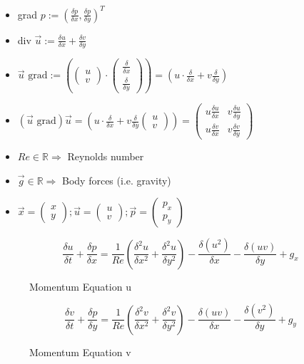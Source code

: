 \documentclass[a4paper,11pt]{scrartcl}
\begin{document}
\begin{itemize}
	\item grad $p := (\frac{\delta p}{\delta x},\frac{\delta p}{\delta y})^T$
	\item div $\vec{u} := \frac{\delta u}{\delta x} + \frac{\delta v}{\delta y}$
	\item $\vec{u} \text{ grad} := \left( \begin{pmatrix}
		u \\
		v
	\end{pmatrix}
	\cdot \begin{pmatrix}
		\frac{\delta}{\delta x} \\
		\frac{\delta}{\delta y}
	\end{pmatrix}\right)
	= (u \cdot \frac{\delta}{\delta x} + v \frac{\delta}{\delta y})$
	\item $(\vec{u} \text{ grad} ) \vec{u} = \left( u \cdot \frac{\delta}{\delta x} + v \frac{\delta}{\delta y}\begin{pmatrix}
		u \\
		v
	\end{pmatrix}\right) = \begin{pmatrix}
		u \frac{\delta u}{\delta x} & v \frac{\delta u}{\delta y}\\
		u \frac{\delta v}{\delta x} & v \frac{\delta v}{\delta y}
	\end{pmatrix}$
	\item $Re \in \mathds{R} \Rightarrow$ Reynolds number
	\item $\vec{g} \in \mathds{R} \Rightarrow$ Body forces (i.e. gravity)
	\item $\vec{x} = \begin{pmatrix}
	x\\
	y
	\end{pmatrix}; \vec{u} = \begin{pmatrix}
	u\\
	v
	\end{pmatrix}; \vec{p} = \begin{pmatrix}
	p_x \\
	p_y
	\end{pmatrix}$
\end{itemize}

\begin{figure}
	\centering
	\[ \frac{\delta u}{\delta t} + \frac{\delta p}{\delta x} = \frac{1}{Re} \left( \frac{\delta^2 u}{\delta x^2} + \frac{\delta^2 u}{\delta y^2}\right) - \frac{\delta (u^2)}{\delta x} - \frac{\delta (uv)}{\delta y} + g_x\]
    \renewcommand{\thefigure}{2.2a}
	\caption{Momentum Equation u}
	\label{fig:momentuma}
\end{figure}
\begin{figure}
	\centering
	\[ \frac{\delta v}{\delta t} + \frac{\delta p}{\delta y} = \frac{1}{Re} \left( \frac{\delta^2 v}{\delta x^2} + \frac{\delta^2 v}{\delta y^2}\right) - \frac{\delta (uv)}{\delta x} - \frac{\delta (v^2)}{\delta y} + g_y\]
    \renewcommand{\thefigure}{2.2b}
	\caption{Momentum Equation v}
	\label{fig:momentuma}
\end{figure}
\end{document}
